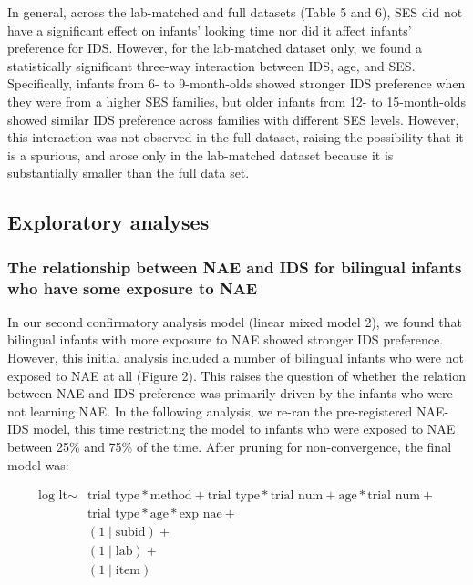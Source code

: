 \documentclass[,man,floatsintext]{apa6}
\begin{document}
In general, across the lab-matched and full datasets (Table 5 and 6), SES did not have a significant effect on infants' looking time nor did it affect infants' preference for IDS. However, for the lab-matched dataset only, we found a statistically significant three-way interaction between IDS, age, and SES. Specifically, infants from 6- to 9-month-olds showed stronger IDS preference when they were from a higher SES families, but older infants from 12- to 15-month-olds showed similar IDS preference across families with different SES levels. However, this interaction was not observed in the full dataset, raising the possibility that it is a spurious, and arose only in the lab-matched dataset because it is substantially smaller than the full data set.

\hypertarget{exploratory-analyses}{%
\subsection{Exploratory analyses}\label{exploratory-analyses}}

\hypertarget{the-relationship-between-nae-and-ids-for-bilingual-infants-who-have-some-exposure-to-nae}{%
\subsubsection{The relationship between NAE and IDS for bilingual infants who have some exposure to NAE}\label{the-relationship-between-nae-and-ids-for-bilingual-infants-who-have-some-exposure-to-nae}}

In our second confirmatory analysis model (linear mixed model 2), we found that bilingual infants with more exposure to NAE showed stronger IDS preference. However, this initial analysis included a number of bilingual infants who were not exposed to NAE at all (Figure 2). This raises the question of whether the relation between NAE and IDS preference was primarily driven by the infants who were not learning NAE. In the following analysis, we re-ran the pre-registered NAE-IDS model, this time restricting the model to infants who were exposed to NAE between 25\% and 75\% of the time. After pruning for non-convergence, the final model was:

\begin{equation}
\begin{split}
\text{log lt} \sim & \text{trial type} * \text{method} + \text{trial type} * \text{trial num} + \text{age} * \text{trial num} + \\
& \text{trial type} * \text{age} * \text{exp nae} + \\
& (1 \mid \text{subid}) + \\
& (1 \mid \text{lab}) + \\
& (1 \mid \text{item})
\end{split}
\end{equation}
\end{document}
